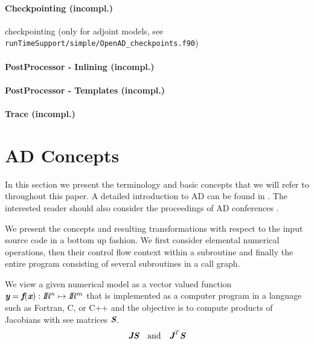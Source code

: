 \documentclass{book}
\newcommand{\R}{I\!\!R}
\newcommand{\bmf}{\mbox{\bf\em f}}
\newcommand{\bmJ}{\mbox{\bf\em J}}
\newcommand{\bmS}{\mbox{\bf\em S}}
\newcommand{\bmx}{\mbox{\bf\em x}}
\newcommand{\bmy}{\mbox{\bf\em y}}
\begin{document}
\subsubsection{Checkpointing (incompl.)}

checkpointing (only  for adjoint models, see \lstinline{runTimeSupport/simple/OpenAD_checkpoints.f90})

\subsubsection{PostProcessor - Inlining (incompl.)}

\subsubsection{PostProcessor - Templates (incompl.)}

\subsubsection{Trace (incompl.)}

\chapter{AD Concepts}\label{sec:ADIntro}

In this section we present the terminology and basic concepts that 
we will refer to throughout this paper. 
A detailed introduction to AD can be found in \cite{Griewank2008EDP}.
The interested reader should also consider the proceedings of AD 
conferences \cite{Griewank1991ADo,Berz1996CDT,Corliss2002ADo,Bucker2005ADA,Bischof2008AiA}.

We present the concepts and resulting transformations 
with respect to the input source code 
in a bottom up fashion.  
We first consider elemental numerical operations, 
then their control flow context within a subroutine and finally the entire program 
consisting of several subroutines in a call graph. 

We view a given numerical model as a 
vector valued function $\bmy=\bmf(\bmx): \R^n\mapsto \R^m$ that is implemented 
as a computer program in a language such as Fortran, C, or C++ and the objective is to  
compute products of Jacobians with see matrices $\bmS$.
\begin{equation}\label{eqn:JacVecProds}
\bmJ \bmS \quad \mbox{and} \quad \bmJ^T \bmS
\end{equation}
\end{document}
